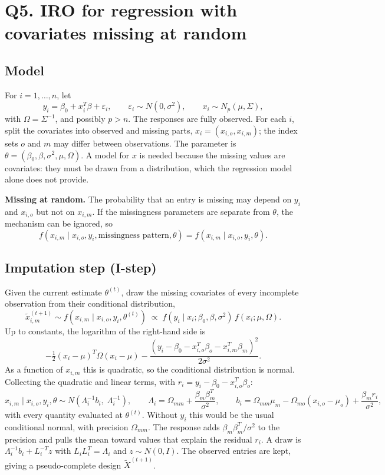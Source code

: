 \documentclass[11pt]{article}
\begin{document}
\newpage
\section*{Q5. IRO for regression with covariates missing at random}

\subsection*{Model}

For $i=1,\ldots,n$, let
\[
y_i=\beta_0+x_i^T\beta+\varepsilon_i,\qquad \varepsilon_i\sim N(0,\sigma^2),\qquad x_i\sim N_p(\mu,\Sigma),
\]
with $\Omega=\Sigma^{-1}$, and possibly $p>n$. The responses are fully observed. For each $i$, split the
covariates into observed and missing parts, $x_i=(x_{i,o},x_{i,m})$; the index sets $o$ and $m$ may differ
between observations. The parameter is $\theta=(\beta_0,\beta,\sigma^2,\mu,\Omega)$. A model for $x$ is needed
because the missing values are covariates: they must be drawn from a distribution, which the regression
model alone does not provide.

\textbf{Missing at random.} The probability that an entry is missing may depend on $y_i$ and $x_{i,o}$ but not on
$x_{i,m}$. If the missingness parameters are separate from $\theta$, the mechanism can be ignored, so
\[
f(x_{i,m}\mid x_{i,o},y_i,\text{missingness pattern},\theta)=f(x_{i,m}\mid x_{i,o},y_i,\theta).
\]

\subsection*{Imputation step (I-step)}

Given the current estimate $\theta^{(t)}$, draw the missing covariates of every incomplete observation from their
conditional distribution,
\[
\tilde x_{i,m}^{(t+1)}\sim f(x_{i,m}\mid x_{i,o},y_i,\theta^{(t)})\;\propto\;
f(y_i\mid x_i;\beta_0,\beta,\sigma^2)\,f(x_i;\mu,\Omega).
\]
Up to constants, the logarithm of the right-hand side is
\[
-\tfrac12(x_i-\mu)^T\Omega(x_i-\mu)-\frac{(y_i-\beta_0-x_{i,o}^T\beta_o-x_{i,m}^T\beta_m)^2}{2\sigma^2}.
\]
As a function of $x_{i,m}$ this is quadratic, so the conditional distribution is normal. Collecting the
quadratic and linear terms, with $r_i=y_i-\beta_0-x_{i,o}^T\beta_o$:
\[
x_{i,m}\mid x_{i,o},y_i,\theta\sim N\!\left(\Lambda_i^{-1}b_i,\;\Lambda_i^{-1}\right),\qquad
\Lambda_i=\Omega_{mm}+\frac{\beta_m\beta_m^T}{\sigma^2},\qquad
b_i=\Omega_{mm}\mu_m-\Omega_{mo}(x_{i,o}-\mu_o)+\frac{\beta_m r_i}{\sigma^2},
\]
with every quantity evaluated at $\theta^{(t)}$. Without $y_i$ this would be the usual conditional normal,
with precision $\Omega_{mm}$. The response adds $\beta_m\beta_m^T/\sigma^2$ to the precision and pulls the
mean toward values that explain the residual $r_i$. A draw is $\Lambda_i^{-1}b_i+L_i^{-T}z$ with
$L_iL_i^T=\Lambda_i$ and $z\sim N(0,I)$. The observed entries are kept, giving a pseudo-complete design
$\tilde X^{(t+1)}$.
\end{document}
